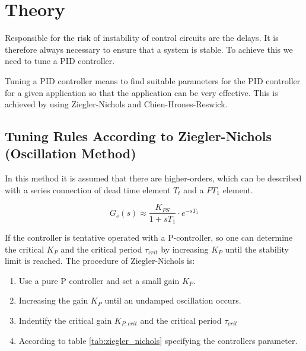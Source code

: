 \section{Theory}

Responsible for the risk of instability of control circuits are the delays. It
is therefore always necessary to ensure that a  system  is  stable. To achieve
this we need to tune a PID controller.

Tuning  a PID controller  means  to  find  suitable  parameters  for  the  PID
controller  for  a  given  application  so  that the application can  be  very
effective. This is achieved by using Ziegler-Nichols and Chien-Hrones-Reswick.


\subsection{Tuning Rules According to Ziegler-Nichols (Oscillation Method)}

In this method it  is  assumed  that  there  are  higher-orders,  which can be
described with a series connection of dead time element $T_{t}$ and a $PT_{1}$
element.

\begin{equation}
    G_{s}(s) \approx \frac{K_{PS}}{1+sT_{1}} \cdot e^{-sT_{1}}
\end{equation}

If the controller  is  tentative  operated  with  a  P-controller,  so one can
determine  the  critical  $K_{P}$  and  the  critical period $\tau_{crit}$  by
increasing $K_{P}$ until the stability limit is reached.
The procedure of Ziegler-Nichols is:

\begin{enumerate}
    \item Use a pure P controller and set a small gain $K_{P}$.
    \item Increasing the gain $K_{P}$ until an undamped oscillation occurs.
    \item Indentify the critical gain $K_{P,crit}$ and the critical period $\tau_{crit}$
    \item According to table \ref{tab:ziegler_nichols} specifying the controllers parameter.
\end{enumerate}

